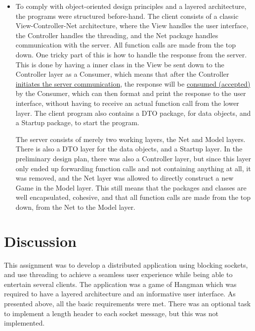 \documentclass[a4paper]{scrartcl}
\begin{document}
\begin{itemize}
    \item To comply with object-oriented design principles and a layered architecture, the programs were structured before-hand. The client consists of a classic View-Controller-Net architecture, where the View handles the user interface, the Controller handles the threading, and the Net package handles communication with the server. All function calls are made from the top down. One tricky part of this is how to handle the response from the server. This is done by having a inner class in the View be sent down to the Controller layer as a Consumer, which means that after the Controller \href{https://github.com/fongie/Hangman/blob/50fc79c8c3e3d40953705370cbfbb7dee6867700/hangmanclient/src/main/java/contr/Controller.java#L35}{initiates the server communication}, the response will be \href{https://github.com/fongie/Hangman/blob/50fc79c8c3e3d40953705370cbfbb7dee6867700/hangmanclient/src/main/java/view/UserInterface.java#L86}{consumed (accepted)} by the Consumer, which can then format and print the response to the user interface, without having to receive an actual function call from the lower layer. The client program also contains a DTO package, for data objects, and a Startup package, to start the program.

        The server consists of merely two working layers, the Net and Model layers. There is also a DTO layer for the data objects, and a Startup layer. In the preliminary design plan, there was also a Controller layer, but since this layer only ended up forwarding function calls and not containing anything at all, it was removed, and the Net layer was allowed to directly construct a new Game in the Model layer. This still means that the packages and classes are well encapsulated, cohesive, and that all function calls are made from the top down, from the Net to the Model layer.

\end{itemize}


\section{Discussion}

This assignment was to develop a distributed application using blocking sockets, and use threading to achieve a seamless user experience while being able to entertain several clients. The application was a game of Hangman which was required to have a layered architecture and an informative user interface. As presented above, all the basic requirements were met. There was an optional task to implement a length header to each socket message, but this was not implemented.
\end{document}
